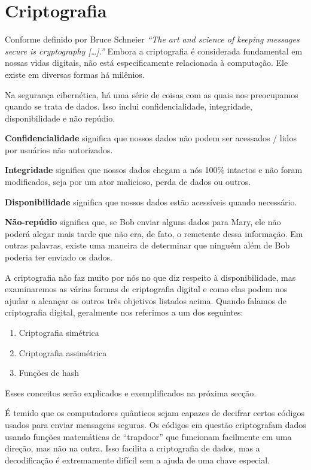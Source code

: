 \section{Criptografia}
Conforme definido por Bruce Schneier \textit{``The art and science of keeping messages secure is cryptography […].''} \cite{13} Embora a criptografia é considerada fundamental em nossas vidas digitais, não está especificamente relacionada à computação. Ele existe em diversas formas há milênios.

Na segurança cibernética, há uma série de coisas com as quais nos preocupamos quando se trata de dados. Isso inclui confidencialidade, integridade, disponibilidade e não repúdio.

\textbf{Confidencialidade} significa que nossos dados não podem ser acessados / lidos por usuários não autorizados.

\textbf{Integridade} significa que nossos dados chegam a nós 100\% intactos e não foram modificados, seja por um ator malicioso, perda de dados ou outros.

\textbf{Disponibilidade} significa que nossos dados estão acessíveis quando necessário.

\textbf{Não-repúdio} significa que, se Bob enviar alguns dados para Mary, ele não poderá alegar mais tarde que não era, de fato, o remetente dessa informação. Em outras palavras, existe uma maneira de determinar que ninguém além de Bob poderia ter enviado os dados.

A criptografia não faz muito por nós no que diz respeito à disponibilidade, mas examinaremos as várias formas de criptografia digital e como elas podem nos ajudar a alcançar os outros três objetivos listados acima. Quando falamos de criptografia digital, geralmente nos referimos a um dos seguintes:
\begin{enumerate}
  \item Criptografia simétrica
  \item Criptografia assimétrica
  \item Funções de hash
\end{enumerate}

Esses conceitos serão explicados e exemplificados na próxima secção.

É temido que os computadores quânticos sejam capazes de decifrar certos códigos usados para enviar mensagens seguras. Os códigos em questão criptografam dados usando funções matemáticas de ``trapdoor'' que funcionam facilmente em uma direção, mas não na outra. Isso facilita a criptografia de dados, mas a decodificação é extremamente difícil sem a ajuda de uma chave especial.

